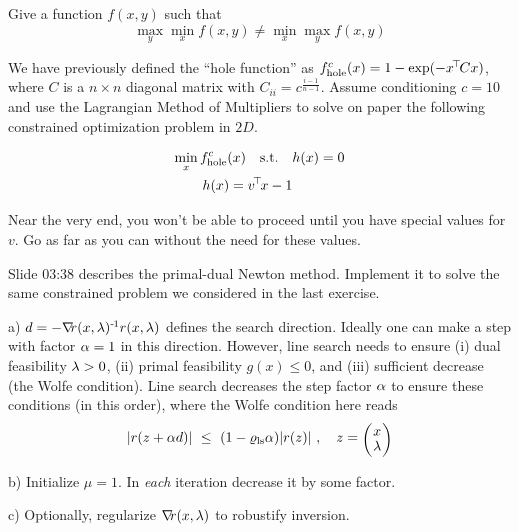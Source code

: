 

\renewcommand{\course}{Optimization}
\renewcommand{\coursepicture}{optim}
\renewcommand{\coursedate}{Summer 2015}
\renewcommand{\exnum}{6}

\exercises


Give a function $f(x,y)$ such that
$$\max_y \min_x f(x,y) \not = \min_x \max_y f(x,y)$$


We have previously defined the ``hole function'' as $f^c_{\text{hole}}(x) =
1-\exp(-x^{\!\top\!} C x)$, where $C$ is a $n\times n$ diagonal matrix with $C_{ii} =
c^{\frac{i-1}{n-1}}$.  Assume conditioning $c=10$ and use the Lagrangian Method
of Multipliers to solve on paper the following constrained optimization problem
in $2D$.

\begin{align}
\min_x f^c_{\text{hole}}(x) \quad\text{s.t.}\quad& h(x)=0 \\
h(x) = v^{\!\top\!} x - 1
\end{align}

Near the very end, you won't be able to proceed until you have special values
for $v$. Go as far as you can without the need for these values.


Slide 03:38 describes the primal-dual Newton method. Implement it to
solve the same constrained problem we considered in the last
exercise.

a) $d=-{\nabla_{\!\!}} r(x,\lambda)^{{\hspace*{-.0pt}\text{\rm -}\hspace*{-.5pt}}1} r(x,\lambda)$ defines the search direction. Ideally
one can make a step with factor $\alpha=1$ in this direction. However,
line search needs to ensure (i) dual feasibility $\lambda>0$, (ii) primal
feasibility $g(x)\le0$, and (iii) sufficient decrease (the Wolfe
condition). Line search decreases the step factor $\alpha$ to ensure these
conditions (in this order), where the Wolfe condition here reads
$$|r(z+\a d)| ~\le~ (1-\varrho_\text{ls}\a)|r(z)| \comma
z = \mat{c}{x\\\l} $$

b) Initialize $\mu=1$. In \emph{each} iteration decrease it by some
factor.

c) Optionally, regularize ${\nabla_{\!\!}}
r(x,\lambda)$ to robustify inversion.

